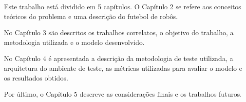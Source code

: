 Este trabalho está dividido em 5 capítulos. O Capítulo 2 se refere aos conceitos teóricos do problema e uma descrição do futebol 
de robôs.

No Capítulo 3 são descritos os trabalhos correlatos, o objetivo do trabalho, a metodologia utilizada e o modelo desenvolvido.

No Capítulo 4 é apresentada a descrição da metodologia de teste utilizada, a arquitetura do ambiente de teste, as métricas utilizadas 
para avaliar o modelo e os resultados obtidos.

Por último, o Capítulo 5 descreve as considerações finais e os trabalhos futuros.
